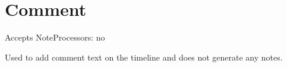 \section{Comment}\label{comment}

Accepts NoteProcessors: no

Used to add comment text on the timeline and does not generate any
notes.

